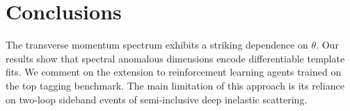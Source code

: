 \section{Conclusions}\label{sec:conclusions}

The transverse momentum spectrum exhibits a striking dependence on
$\theta$. Our results show that spectral anomalous dimensions encode
differentiable template fits. We comment on the extension to
reinforcement learning agents trained on the top tagging benchmark. The
main limitation of this approach is its reliance on two-loop sideband
events of semi-inclusive deep inelastic scattering.

